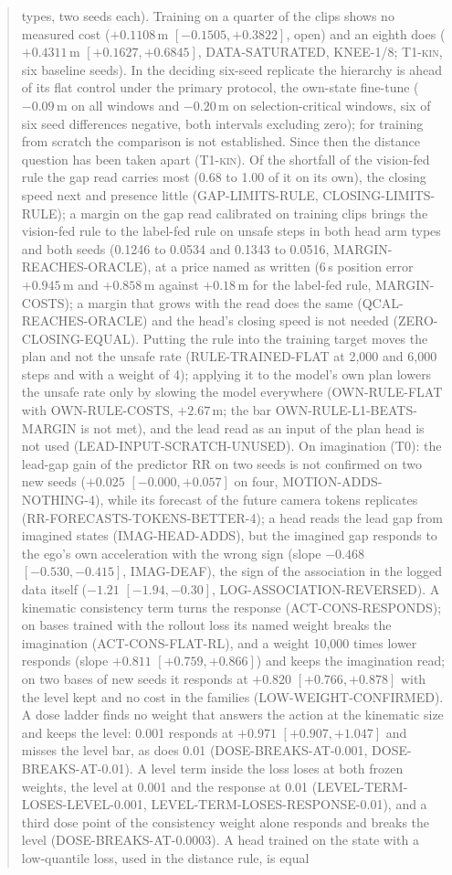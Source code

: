 \documentclass[10pt,twocolumn]{article}
\theoremstyle{remark}
\newcommand{\tier}[1]{\textsc{\small #1}}
\begin{document}
\begin{abstract}
types, two seeds each). Training on a quarter of the clips shows no measured cost ($+0.1108$\,m $[-0.1505,+0.3822]$, open) and an eighth does ($+0.4311$\,m $[+0.1627,+0.6845]$, DATA-SATURATED, KNEE-1/8; \tier{T1-kin}, six baseline seeds). In the deciding six-seed replicate the hierarchy is ahead of its flat control under the primary protocol, the own-state fine-tune ($-0.09$\,m on all windows and $-0.20$\,m on selection-critical windows, six of six seed differences negative, both intervals excluding zero); for training from scratch the comparison is not established. Since then the distance question has been taken apart (\tier{T1-kin}). Of the shortfall of the vision-fed rule the gap read carries most (0.68 to 1.00 of it on its own), the closing speed next and presence little (GAP-LIMITS-RULE, CLOSING-LIMITS-RULE); a margin on the gap read calibrated on training clips brings the vision-fed rule to the label-fed rule on unsafe steps in both head arm types and both seeds (0.1246 to 0.0534 and 0.1343 to 0.0516, MARGIN-REACHES-ORACLE), at a price named as written (6\,s position error $+0.945$\,m and $+0.858$\,m against $+0.18$\,m for the label-fed rule, MARGIN-COSTS); a margin that grows with the read does the same (QCAL-REACHES-ORACLE) and the head's closing speed is not needed (ZERO-CLOSING-EQUAL). Putting the rule into the training target moves the plan and not the unsafe rate (RULE-TRAINED-FLAT at 2,000 and 6,000 steps and with a weight of 4); applying it to the model's own plan lowers the unsafe rate only by slowing the model everywhere (OWN-RULE-FLAT with OWN-RULE-COSTS, $+2.67$\,m; the bar OWN-RULE-L1-BEATS-MARGIN is not met), and the lead read as an input of the plan head is not used (LEAD-INPUT-SCRATCH-UNUSED). On imagination (\tier{T0}): the lead-gap gain of the predictor RR on two seeds is not confirmed on two new seeds ($+0.025$ $[-0.000,+0.057]$ on four, MOTION-ADDS-NOTHING-4), while its forecast of the future camera tokens replicates (RR-FORECASTS-TOKENS-BETTER-4); a head reads the lead gap from imagined states (IMAG-HEAD-ADDS), but the imagined gap responds to the ego's own acceleration with the wrong sign (slope $-0.468$ $[-0.530,-0.415]$, IMAG-DEAF), the sign of the association in the logged data itself ($-1.21$ $[-1.94,-0.30]$, LOG-ASSOCIATION-REVERSED). A kinematic consistency term turns the response (ACT-CONS-RESPONDS); on bases trained with the rollout loss its named weight breaks the imagination (ACT-CONS-FLAT-RL), and a weight 10,000 times lower responds (slope $+0.811$ $[+0.759,+0.866]$) and keeps the imagination read; on two bases of new seeds it responds at $+0.820$ $[+0.766,+0.878]$ with the level kept and no cost in the families (LOW-WEIGHT-CONFIRMED). A dose ladder finds no weight that answers the action at the kinematic size and keeps the level: 0.001 responds at $+0.971$ $[+0.907,+1.047]$ and misses the level bar, as does 0.01 (DOSE-BREAKS-AT-0.001, DOSE-BREAKS-AT-0.01). A level term inside the loss loses at both frozen weights, the level at 0.001 and the response at 0.01 (LEVEL-TERM-LOSES-LEVEL-0.001, LEVEL-TERM-LOSES-RESPONSE-0.01), and a third dose point of the consistency weight alone responds and breaks the level (DOSE-BREAKS-AT-0.0003). A head trained on the state with a low-quantile loss, used in the distance rule, is equal 
\end{abstract}
\end{document}

